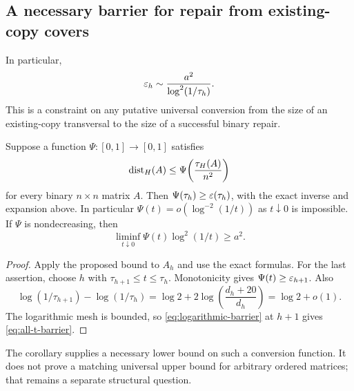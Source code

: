 \subsection{A necessary barrier for repair from existing-copy covers}

In particular,
\begin{equation}
 \varepsilon_h\sim\frac{a^2}{\log^2(1/\tau_h)}.
 \label{eq:logarithmic-barrier}
\end{equation}
This is a constraint on any putative universal conversion from the
size of an existing-copy transversal to the size of a successful
binary repair.

\begin{corollary}
\label{cor:inverse-barrier}
Suppose a function \(\Psi:[0,1]\to[0,1]\) satisfies
\[
 \operatorname{dist}_H(A)\le\Psi\!\left(\frac{\tau_H(A)}{n^2}\right)
\]
for every binary \(n\times n\) matrix \(A\). Then
\(\Psi(\tau_h)\ge\varepsilon(\tau_h)\), with the exact inverse and
expansion above. In particular \(\Psi(t)=o(\log^{-2}(1/t))\) as
\(t\downarrow0\) is impossible. If \(\Psi\) is nondecreasing, then
\begin{equation}
 \liminf_{t\downarrow0}\Psi(t)\log^2(1/t)\ge a^2.
 \label{eq:all-t-barrier}
\end{equation}
\end{corollary}
\begin{proof}
Apply the proposed bound to \(A_h\) and use the exact formulas.
For the last assertion, choose \(h\) with
\(\tau_{h+1}\le t\le\tau_h\). Monotonicity gives
\(\Psi(t)\ge\varepsilon_{h+1}\). Also
\[
 \log(1/\tau_{h+1})-\log(1/\tau_h)
 =\log2+2\log\left(\frac{d_h+20}{d_h}\right)=\log2+o(1).
\]
The logarithmic mesh is bounded, so \eqref{eq:logarithmic-barrier}
at \(h+1\) gives \eqref{eq:all-t-barrier}.
\end{proof}

The corollary supplies a necessary lower bound on such a conversion
function. It does not prove a matching universal upper bound for
arbitrary ordered matrices; that remains a separate structural question.
